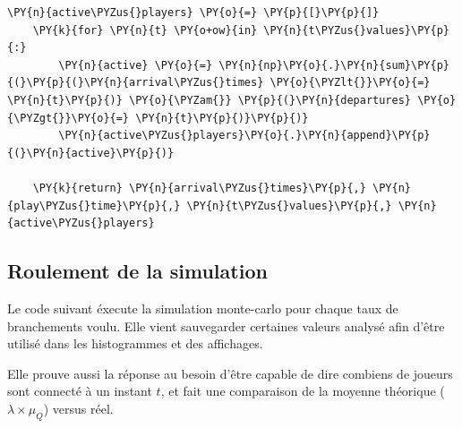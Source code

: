 \begin{tcolorbox}[breakable, size=fbox, boxrule=1pt, pad at break*=1mm,colback=cellbackground, colframe=cellborder]
\begin{Verbatim}[commandchars=\\\{\}]
    \PY{n}{active\PYZus{}players} \PY{o}{=} \PY{p}{[}\PY{p}{]}
    \PY{k}{for} \PY{n}{t} \PY{o+ow}{in} \PY{n}{t\PYZus{}values}\PY{p}{:}
        \PY{n}{active} \PY{o}{=} \PY{n}{np}\PY{o}{.}\PY{n}{sum}\PY{p}{(}\PY{p}{(}\PY{n}{arrival\PYZus{}times} \PY{o}{\PYZlt{}}\PY{o}{=} \PY{n}{t}\PY{p}{)} \PY{o}{\PYZam{}} \PY{p}{(}\PY{n}{departures} \PY{o}{\PYZgt{}}\PY{o}{=} \PY{n}{t}\PY{p}{)}\PY{p}{)}
        \PY{n}{active\PYZus{}players}\PY{o}{.}\PY{n}{append}\PY{p}{(}\PY{n}{active}\PY{p}{)}

    \PY{k}{return} \PY{n}{arrival\PYZus{}times}\PY{p}{,} \PY{n}{play\PYZus{}time}\PY{p}{,} \PY{n}{t\PYZus{}values}\PY{p}{,} \PY{n}{active\PYZus{}players}
\end{Verbatim}
\end{tcolorbox}

    \subsection{Roulement de la
simulation}\label{roulement-de-la-simulation}

Le code suivant éxecute la simulation monte-carlo pour chaque taux de
branchements voulu. Elle vient sauvegarder certaines valeurs analysé
afin d'être utilisé dans les histogrammes et des affichages.

Elle prouve aussi la réponse au besoin d'être capable de dire combiens
de joueurs sont connecté à un instant \(t\), et fait une comparaison de
la moyenne théorique (\(\lambda\times\mu_Q\)) versus réel.

